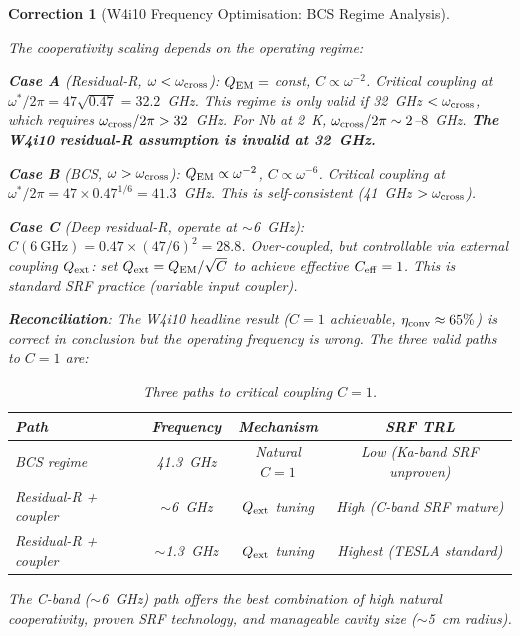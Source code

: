 \documentclass[11pt]{article}
\newtheorem{correction}{Correction}
\newcommand{\QEM}{Q_{\rm EM}}
\begin{document}
\begin{correction}[W4i10 Frequency Optimisation: BCS Regime Analysis]
\label{corr:BCS-regime}

The cooperativity scaling depends on the operating regime:

\textbf{Case A} (Residual-R, $\omega < \omega_{\rm cross}$): $\QEM =$
const, $C \propto \omega^{-2}$. Critical coupling at $\omega^*/2\pi
= 47\sqrt{0.47} = 32.2$~GHz. \emph{This regime is only valid if
32~GHz $< \omega_{\rm cross}$, which requires $\omega_{\rm cross}/2\pi
> 32$~GHz.} For Nb at 2~K, $\omega_{\rm cross}/2\pi \sim 2$--$8$~GHz.
\textbf{The W4i10 residual-R assumption is invalid at 32~GHz.}

\textbf{Case B} (BCS, $\omega > \omega_{\rm cross}$): $\QEM \propto
\omega^{-2}$, $C \propto \omega^{-6}$. Critical coupling at
$\omega^*/2\pi = 47 \times 0.47^{1/6} = 41.3$~GHz. This is
self-consistent (41~GHz $> \omega_{\rm cross}$).

\textbf{Case C} (Deep residual-R, operate at $\sim$6~GHz):
$C(6~\text{GHz}) = 0.47 \times (47/6)^2 = 28.8$. Over-coupled, but
controllable via external coupling $Q_{\rm ext}$: set $Q_{\rm ext} =
\QEM / \sqrt{C}$ to achieve effective $C_{\rm eff} = 1$. This is
standard SRF practice (variable input coupler).

\textbf{Reconciliation}: The W4i10 headline result ($C = 1$ achievable,
$\eta_{\rm conv} \approx 65\%$) is \emph{correct in conclusion} but the
\emph{operating frequency} is wrong. The three valid paths to $C = 1$ are:

\begin{table}[H]
\centering
\caption{Three paths to critical coupling $C = 1$.}
\begin{tabular}{@{}lccc@{}}
\toprule
Path & Frequency & Mechanism & SRF TRL \\
\midrule
BCS regime & 41.3~GHz & Natural $C = 1$ & Low (Ka-band SRF unproven) \\
Residual-R + coupler & $\sim$6~GHz & $Q_{\rm ext}$ tuning & High (C-band SRF mature) \\
Residual-R + coupler & $\sim$1.3~GHz & $Q_{\rm ext}$ tuning & Highest (TESLA standard) \\
\bottomrule
\end{tabular}
\end{table}

The C-band ($\sim$6~GHz) path offers the best combination of high natural
cooperativity, proven SRF technology, and manageable cavity size ($\sim$5~cm
radius).
\end{correction}
\end{document}

